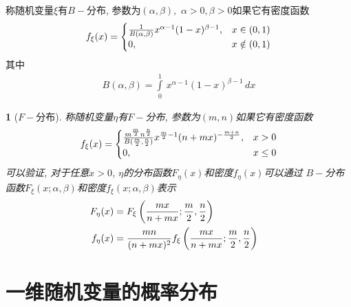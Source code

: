 \begin{beta_distru}
称随机变量\(\xi\)有\(B-\)分布, 参数为\((\alpha, \beta),\,\,\alpha>0,\beta>0\)如果它有密度函数
\begin{align}
f_{\xi}(x) = \begin{cases}{1\over B(\alpha, \beta)}x^{\alpha - 1}(1-x)^{\beta - 1}, & x\in(0,1)\cr
0, & x\notin(0, 1)\end{cases}
\end{align}
其中
\begin{align}
    B(\alpha, \beta) = \int\limits_{0}^{1}\,x^{\alpha - 1}(1-x)^{\beta - 1}\,dx
\end{align}
\end{beta_distru}

\newtheorem{snedecor_distribution}[dis_root]{\disfunc}
\begin{snedecor_distribution}[\(F-\)分布]
称随机变量\(\eta\)有\(F-\)分布, 参数为\((m, n)\)如果它有密度函数
\begin{align}
f_{\xi}(x) = \begin{cases}{m^{m\over 2}n^{n\over 2}\over B({m\over 2}, {n\over 2})}x^{{m\over 2} - 1}(n+mx)^{-{m+n\over 2}}, & x>0\cr
0, & x\le 0\end{cases}
\end{align}
可以验证, 对于任意\(x>0\), \(\eta\)的分布函数\(F_{\eta}(x)\)和密度\(f_{\eta}(x)\)可以通过
\(B-\)分布函数\(F_{\xi}(x; \alpha, \beta)\)和密度\(f_{\xi}(x; \alpha, \beta)\)表示
\begin{align}
    F_{\eta}(x) &= F_{\xi}\left({mx\over n + mx}; {m\over 2}, {n\over 2}\right)\cr
    f_{\eta}(x) &= {\displaystyle mn\over(n+mx)^2}f_{\xi}\left({mx\over n + mx}; {m\over 2}, {n\over 2}\right)
\end{align}
\end{snedecor_distribution}


\section{一维随机变量的概率分布}%

